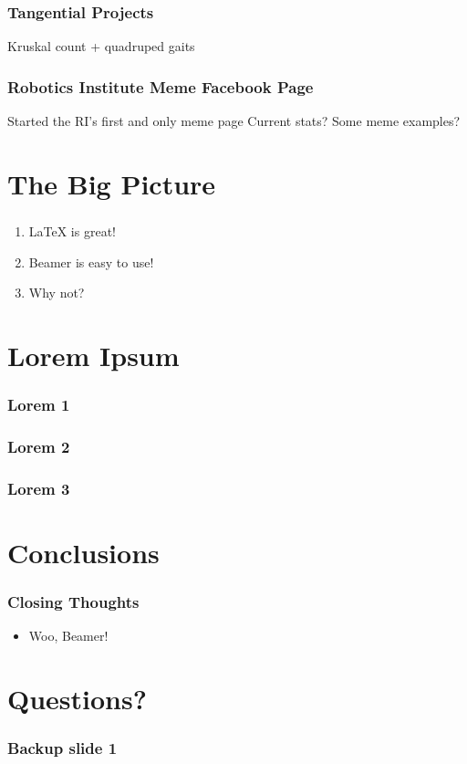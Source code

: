 \documentclass[aspectratio=169]{beamer}
\begin{document}
		\begin{frame}
			\frametitle{Tangential Projects}
			Kruskal count + quadruped gaits
		\end{frame}
	
		\begin{frame}
			\frametitle{Robotics Institute Meme Facebook Page}
			Started the RI's first and only meme page
			Current stats?
			Some meme examples?
		\end{frame}
	
	\section{The Big Picture}
		\begin{frame}
			\frametitle{}
			\begin{enumerate}
				\item LaTeX is great!
				\item Beamer is easy to use!
				\item Why not?
			\end{enumerate}
		\end{frame}

	\section{Lorem Ipsum}
		\begin{frame}
			\frametitle{Lorem 1}
			\blindtext
		\end{frame}

		\begin{frame}
			\frametitle{Lorem 2}
			\blindtext
		\end{frame}

		\begin{frame}
			\frametitle{Lorem 3}
			\blindtext
		\end{frame}

	\section{Conclusions}
		\begin{frame}
			\frametitle{Closing Thoughts}
			\begin{itemize}
				\item Woo, Beamer!
			\end{itemize}
		\end{frame}
	
	\section{Questions?}
		
	
	\appendix
	\backupbegin
	  \begin{frame}
	    \frametitle{Backup slide 1}
	    \blindtext
	  \end{frame}
	\backupend
\end{document}
